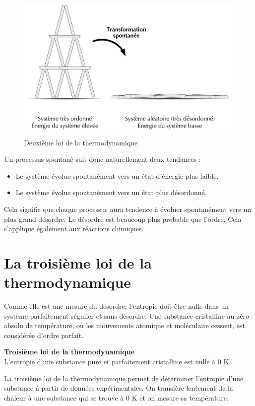 \documentclass[
  11pt,
  french,
  a4paper,
  openany]{book}
\providecommand{\tightlist}{%
  \setlength{\itemsep}{0pt}\setlength{\parskip}{0pt}}
\begin{document}
\clearpage

\begin{figure}

{\centering \includegraphics[width=0.4\linewidth]{images/cards-castle} 

}

\caption{Deuxième loi de la thermodynamique}\label{fig:cards-castle}
\end{figure}

Un processus spontané suit donc naturellement deux tendances :

\begin{itemize}
\tightlist
\item
  Le système évolue spontanément vers un état d'énergie plus faible.
\item
  Le système évolue spontanément vers un état plus désordonné.
\end{itemize}

Cela signifie que chaque processus aura tendence à évoluer spontanément vers un plus grand désordre. Le désordre est beaucoup plus probable que l'ordre. Cela s'applique également aux réactions chimiques.

\hypertarget{la-troisiuxe8me-loi-de-la-thermodynamique}{%
\section{La troisième loi de la thermodynamique}\label{la-troisiuxe8me-loi-de-la-thermodynamique}}

Comme elle est une mesure du désordre, l'entropie doit être nulle dans un système parfaitement régulier et sans désordre. Une substance cristalline au zéro absolu de température, où les mouvements atomique et moléculaire cessent, est considérée d'ordre parfait.

\begin{tcolorbox}
\textbf{Troisième loi de la thermodynamique}\\
L'entropie d'une substance pure et parfaitement cristalline est nulle à 0 K.

\end{tcolorbox}

La troisième loi de la thermodynamique permet de déterminer l'entropie d'une substance à partir de données expérimentales. On transfère lentement de la chaleur à une substance qui se trouve à 0 K et on mesure sa température.
\end{document}
